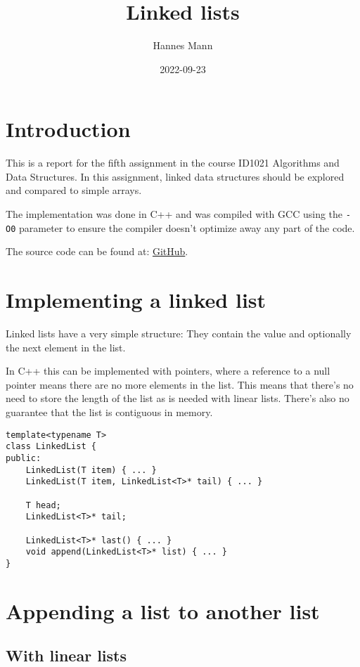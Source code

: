 \documentclass[a4paper,11pt]{article}
\begin{document}
\title{
    \textbf{Linked lists}
}
\author{Hannes Mann}
\date{2022-09-23}

\maketitle

\section*{Introduction}

This is a report for the fifth assignment in the course ID1021 Algorithms and Data Structures. In this assignment, linked data structures should be explored and compared to simple arrays.

The implementation was done in C++ and was compiled with GCC using the {\tt -O0} parameter to ensure the compiler doesn't optimize away any part of the code.

The source code can be found at: \href{https://github.com/HannesMann/ID1021/tree/main/src/linked_list}{GitHub}.

\section*{Implementing a linked list}

Linked lists have a very simple structure: They contain the value and optionally the next element in the list.

In C++ this can be implemented with pointers, where a reference to a null pointer means there are no more elements in the list.
This means that there's no need to store the length of the list as is needed with linear lists.
There's also no guarantee that the list is contiguous in memory.

\begin{verbatim}
template<typename T>
class LinkedList {
public:
	LinkedList(T item) { ... }
	LinkedList(T item, LinkedList<T>* tail) { ... }

	T head;
	LinkedList<T>* tail;

	LinkedList<T>* last() { ... }
	void append(LinkedList<T>* list) { ... }
}
\end{verbatim}

\section*{Appending a list to another list}

\subsection*{With linear lists}
\end{document}
